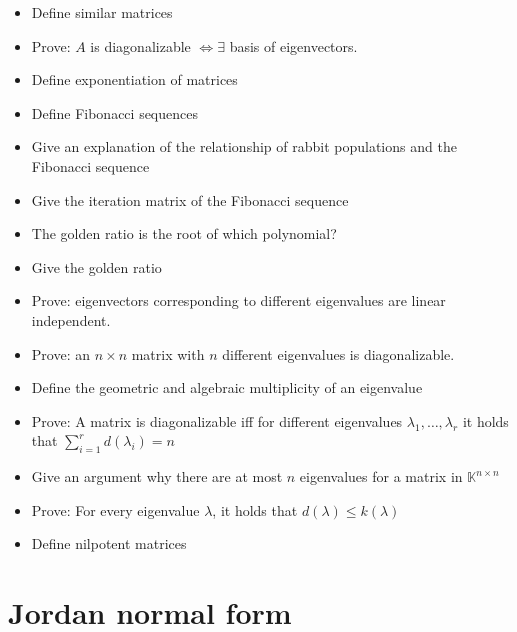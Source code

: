 \documentclass[a4paper]{article}
\begin{document}
\begin{itemize}
  \item Define similar matrices
  \item Prove: $A$ is diagonalizable $\iff \exists$ basis of eigenvectors.
  \item Define exponentiation of matrices
  \item Define Fibonacci sequences
  \item Give an explanation of the relationship of rabbit populations and the Fibonacci sequence
  \item Give the iteration matrix of the Fibonacci sequence
  \item The golden ratio is the root of which polynomial?
  \item Give the golden ratio
  \item Prove: eigenvectors corresponding to different eigenvalues are linear independent.
  \item Prove: an $n\times n$ matrix with $n$ different eigenvalues is diagonalizable.
  \item Define the geometric and algebraic multiplicity of an eigenvalue
  \item Prove: A matrix is diagonalizable iff for different eigenvalues $\lambda_1, \dots, \lambda_r$ it holds that $\sum_{i=1}^r d(\lambda_i) = n$
  \item Give an argument why there are at most $n$ eigenvalues for a matrix in $\mathbb K^{n \times n}$
  \item Prove: For every eigenvalue $\lambda$, it holds that $d(\lambda) \leq k(\lambda)$
  \item Define nilpotent matrices
\end{itemize}

\section{Jordan normal form}
\end{document}
